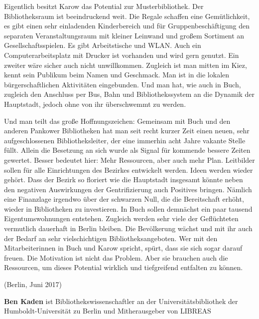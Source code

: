 \documentclass[a4paper,
fontsize=11pt,
oneside,
numbers=noperiodatend,
parskip=half-,
bibliography=totoc,
final
]{scrartcl}
\begin{document}
Eigentlich besitzt Karow das Potential zur Musterbibliothek. Der
Bibliotheksraum ist beeindruckend weit. Die Regale schaffen eine
Gemütlichkeit, es gibt einen sehr einladenden Kinderbereich und für
Gruppenbeschäftigung den separaten Veranstaltungsraum mit kleiner
Leinwand und großem Sortiment an Gesellschaftsspielen. Es gibt
Arbeitstische und WLAN. Auch ein Computerarbeitsplatz mit Drucker ist
vorhanden und wird gern genutzt. Ein zweiter wäre sicher auch nicht
unwillkommen. Zugleich ist man mitten im Kiez, kennt sein Publikum beim
Namen und Geschmack. Man ist in die lokalen bürgerschaftlichen
Aktivitäten eingebunden. Und man hat, wie auch in Buch, zugleich den
Anschluss per Bus, Bahn und Bibliothekssystem an die Dynamik der
Hauptstadt, jedoch ohne von ihr überschwemmt zu werden.

Und man teilt das große Hoffnungszeichen: Gemeinsam mit Buch und den
anderen Pankower Bibliotheken hat man seit recht kurzer Zeit einen
neuen, sehr aufgeschlossenen Bibliotheksleiter, der eine immerhin acht
Jahre vakante Stelle füllt. Allein die Besetzung an sich wurde als
Signal für kommende bessere Zeiten gewertet. Besser bedeutet hier: Mehr
Ressourcen, aber auch mehr Plan. Leitbilder sollen für alle
Einrichtungen des Bezirkes entwickelt werden. Ideen werden wieder
gehört. Dass der Bezirk so floriert wie die Hauptstadt insgesamt könnte
neben den negativen Auswirkungen der Gentrifizierung auch Positives
bringen. Nämlich eine Finanzlage irgendwo über der schwarzen Null, die
die Bereitschaft erhöht, wieder in Bibliotheken zu investieren. In Buch
sollen demnächst ein paar tausend Eigentumswohnungen entstehen. Zugleich
werden sehr viele der Geflüchteten vermutlich dauerhaft in Berlin
bleiben. Die Bevölkerung wächst und mit ihr auch der Bedarf an sehr
vielschichtigen Bibliotheksangeboten. Wer mit den Mitarbeiterinnen in
Buch und Karow spricht, spürt, dass sie sich sogar darauf freuen. Die
Motivation ist nicht das Problem. Aber sie brauchen auch die Ressourcen,
um dieses Potential wirklich und tiefgreifend entfalten zu können.

(Berlin, Juni 2017)

\textbf{Ben Kaden} ist Bibliothekswissenschaftler an der
Universitätsbibliothek der Humboldt-Universität zu Berlin und
Mitherausgeber von LIBREAS
\end{document}
